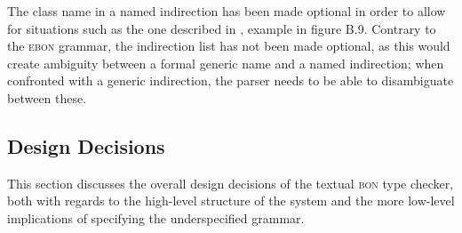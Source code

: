 The class name in a named indirection has been made optional in order to allow for situations such as the one described in \cite[p.~372]{walden1995}, example in figure B.9. Contrary to the \textsc{ebon} grammar, the indirection list has not been made optional, as this would create ambiguity between a formal generic name and a named indirection; when confronted with a generic indirection, the parser needs to be able to disambiguate between these.

\subsection{Design Decisions}
This section discusses the overall design decisions of the textual \textsc{bon} type checker, both with regards to the high-level structure of the system and the more low-level implications of specifying the underspecified grammar.
